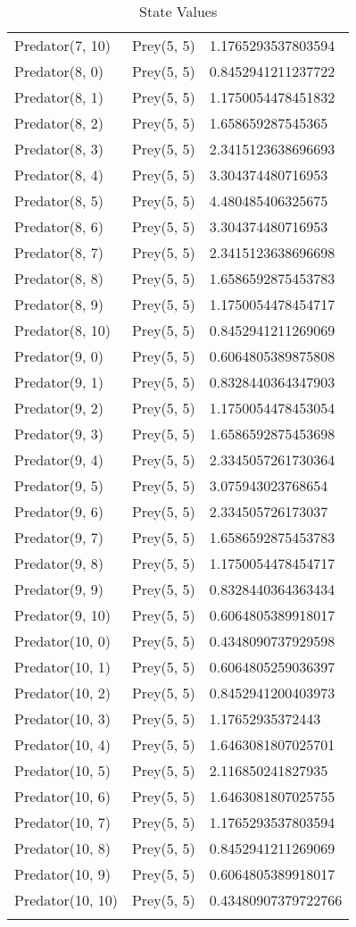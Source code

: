 \begin{longtable}{| p{} | p{} | p{} |}
Predator(7, 10) & Prey(5, 5) &1.1765293537803594\\
Predator(8, 0) & Prey(5, 5) &0.8452941211237722\\
Predator(8, 1) & Prey(5, 5) &1.1750054478451832\\
Predator(8, 2) & Prey(5, 5) &1.658659287545365\\
Predator(8, 3) & Prey(5, 5) &2.3415123638696693\\
Predator(8, 4) & Prey(5, 5) &3.304374480716953\\
Predator(8, 5) & Prey(5, 5) &4.480485406325675\\
Predator(8, 6) & Prey(5, 5) &3.304374480716953\\
Predator(8, 7) & Prey(5, 5) &2.3415123638696698\\
Predator(8, 8) & Prey(5, 5) &1.6586592875453783\\
Predator(8, 9) & Prey(5, 5) &1.1750054478454717\\
Predator(8, 10) & Prey(5, 5) &0.8452941211269069\\
Predator(9, 0) & Prey(5, 5) &0.6064805389875808\\
Predator(9, 1) & Prey(5, 5) &0.8328440364347903\\
Predator(9, 2) & Prey(5, 5) &1.1750054478453054\\
Predator(9, 3) & Prey(5, 5) &1.6586592875453698\\
Predator(9, 4) & Prey(5, 5) &2.3345057261730364\\
Predator(9, 5) & Prey(5, 5) &3.075943023768654\\
Predator(9, 6) & Prey(5, 5) &2.334505726173037\\
Predator(9, 7) & Prey(5, 5) &1.6586592875453783\\
Predator(9, 8) & Prey(5, 5) &1.1750054478454717\\
Predator(9, 9) & Prey(5, 5) &0.8328440364363434\\
Predator(9, 10) & Prey(5, 5) &0.6064805389918017\\
Predator(10, 0) & Prey(5, 5) &0.4348090737929598\\
Predator(10, 1) & Prey(5, 5) &0.6064805259036397\\
Predator(10, 2) & Prey(5, 5) &0.8452941200403973\\
Predator(10, 3) & Prey(5, 5) &1.17652935372443\\
Predator(10, 4) & Prey(5, 5) &1.6463081807025701\\
Predator(10, 5) & Prey(5, 5) &2.116850241827935\\
Predator(10, 6) & Prey(5, 5) &1.6463081807025755\\
Predator(10, 7) & Prey(5, 5) &1.1765293537803594\\
Predator(10, 8) & Prey(5, 5) &0.8452941211269069\\
Predator(10, 9) & Prey(5, 5) &0.6064805389918017\\
Predator(10, 10) & Prey(5, 5) &0.43480907379722766\\
\caption{State Values} 
\label{tab:myfirstlongtable}
\end{longtable}

